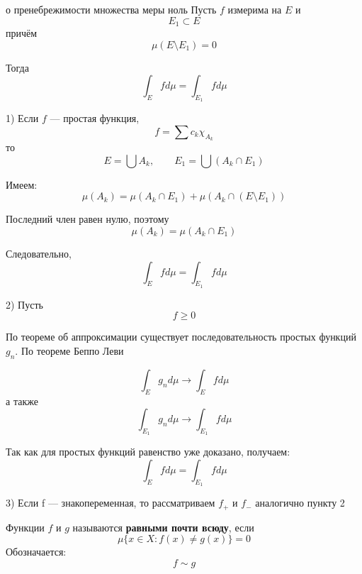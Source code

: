 \documentclass[12pt,a4paper]{article}
\begin{document}
\begin{theorem}{о пренебрежимости множества меры ноль}
    Пусть $f$ измерима на $E$ и
    \[
        E_1\subset E
    \]
    причём
    \[
        \mu(E\setminus E_1)=0
    \]

    Тогда
    \[
        \int_E f d\mu
        =
        \int_{E_1}f d\mu
    \]
\end{theorem}

\begin{proofbox}{}
    1) Если $f$ — простая функция,
    \[
        f=\sum c_k\chi_{A_k}
    \]
    то
    \[
        E=\bigcup A_k,
        \qquad
        E_1=\bigcup(A_k\cap E_1)
    \]

    Имеем:
    \[
        \mu(A_k)
        =
        \mu(A_k\cap E_1)+
        \mu(A_k\cap(E\setminus E_1))
    \]

    Последний член равен нулю, поэтому
    \[
        \mu(A_k)=\mu(A_k\cap E_1)
    \]

    Следовательно,
    \[
        \int_E f d\mu
        =
        \int_{E_1}f d\mu
    \]

    2) Пусть
    \[
        f\geq0
    \]

    По теореме об аппроксимации существует последовательность простых функций $g_n$. По теореме Беппо Леви

    \[
        \int_Eg_n d\mu\to\int_Ef d\mu
    \]
    а также
    \[
        \int_{E_1}g_n d\mu\to\int_{E_1}f d\mu
    \]

    Так как для простых функций равенство уже доказано, получаем:
    \[
        \int_Ef d\mu
        =
        \int_{E_1}f d\mu
    \]

    3) Если f — знакопеременная, то рассматриваем $f_+$ и $f_-$ аналогично пункту 2

\end{proofbox}

\begin{definition}
    Функции $f$ и $g$ называются \textbf{равными почти всюду}, если
    \[
        \mu\{x\in X:f(x)\neq g(x)\}=0
    \]
    Обозначается:
    \[
        f\sim g
    \]
\end{definition}
\end{document}
